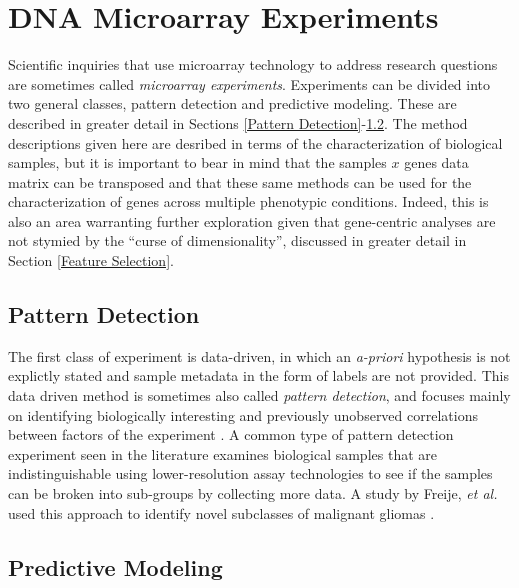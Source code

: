 \section{DNA Microarray Experiments}

Scientific inquiries that use microarray technology to address research
questions are sometimes called \emph{microarray experiments}.  Experiments can
be divided into two general classes, pattern detection and predictive modeling.
These are described in greater detail in Sections \ref{Pattern
Detection}-\ref{Predictive Modeling}.  The method descriptions given here are
desribed in terms of the characterization of biological samples, but it is
important to bear in mind that the samples $x$ genes data matrix can be
transposed and that these same methods can be used for the characterization of
genes across multiple phenotypic conditions.  Indeed, this is also an area
warranting further exploration given that gene-centric analyses are not stymied
by the ``curse of dimensionality'', discussed in greater detail in Section
\ref{Feature Selection}.

\subsection{Pattern Detection}
\label{Pattern Detection}

The first class of experiment is data-driven, in which an \emph{a-priori}
hypothesis is not explictly stated and sample metadata in the form of labels
are not provided.  This data driven method is sometimes also called
\emph{pattern detection}, and focuses mainly on identifying biologically
interesting and previously unobserved correlations between factors of the
experiment \cite{Dubitzky2003IMD}.  A common type of pattern detection
experiment seen in the literature examines biological samples that are
indistinguishable using lower-resolution assay technologies to see if the
samples can be broken into sub-groups by collecting more data.   A study by
Freije, \emph{et al.} used this approach to identify novel subclasses of
malignant gliomas \cite{PMID_15374961}.

\subsection{Predictive Modeling}
\label{Predictive Modeling}

